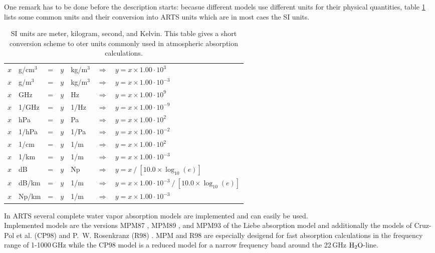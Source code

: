 {One remark has to be done before the description starts: becasue different 
models use different units for their physical quantities,
table \ref{table:si_units} lists some common units and their conversion into 
ARTS units which are in most caes the SI units.
\begin{table}[!ht]
\begin{center}
\begin{tabular}{r@{~}lcr@{~}lll}
\hline
$x$ & g/cm$^3$ & = & $y$ & kg/m$^3$ & $\Longrightarrow$ & $y = x \times 1.00\cdot 10^{3}$ \\
$x$ & g/m$^3$  & = & $y$ & kg/m$^3$ & $\Longrightarrow$ & $y = x \times 1.00\cdot 10^{-3}$ \\
$x$ & GHz      & = & $y$ & Hz       & $\Longrightarrow$ & $y = x \times 1.00\cdot 10^{9}$ \\
$x$ & 1/GHz    & = & $y$ & 1/Hz     & $\Longrightarrow$ & $y = x \times 1.00\cdot 10^{-9}$ \\
$x$ & hPa      & = & $y$ & Pa       & $\Longrightarrow$ & $y = x \times 1.00\cdot 10^{2}$ \\
$x$ & 1/hPa    & = & $y$ & 1/Pa     & $\Longrightarrow$ & $y = x \times 1.00\cdot 10^{-2}$ \\
$x$ & 1/cm     & = & $y$ & 1/m      & $\Longrightarrow$ & $y = x \times 1.00\cdot 10^{2}$ \\
$x$ & 1/km     & = & $y$ & 1/m      & $\Longrightarrow$ & $y = x \times 1.00\cdot 10^{-3}$ \\
$x$ & dB       & = & $y$ & Np       & $\Longrightarrow$ & $y = x~/~[10.0 \times \log_{10}{(e)}]$ \\
$x$ & dB/km    & = & $y$ & 1/m      & $\Longrightarrow$ & $y = x \times 1.00\cdot 10^{-3}~/~[10.0 \times \log_{10}{(e)}]$\\
$x$ & Np/km    & = & $y$ & 1/m      & $\Longrightarrow$ & $y = x \times 1.00\cdot 10^{-3}$ \\
\hline
\end{tabular}
\caption{SI units are meter, kilogram, second, and Kelvin. 
  This table gives a short conversion scheme to oter units
  commonly used in atmospheric absorption calculations.}
\label{table:si_units}
\end{center}
\end{table}
%
%
%
%
\label{levelc:CompWatVapMod}
%
In ARTS several complete water vapor absorption models are implemented and 
can easily be used.\\
Implemented models are the versions MPM87 \cite{liebeandlayton:87}, MPM89 
\cite{liebe:89}, and MPM93 \cite{liebeetal:93} of the Liebe absorption 
model and additionally the models of Cruz-Pol et al. (CP98) \cite{cruzpol:98} 
and P.~W. Rosenkranz (R98) \cite{pwr:98}. 
MPM and R98 are especially desigend for fast absorption calculations in 
the frequency range of 1-1000\,GHz while the CP98 model is a reduced model 
for a narrow frequency band around the 22\,GHz $\mbox{H}_2\mbox{O}$-line.

}
